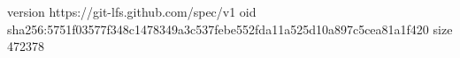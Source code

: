 version https://git-lfs.github.com/spec/v1
oid sha256:5751f03577f348c1478349a3c537febe552fda11a525d10a897c5cea81a1f420
size 472378
